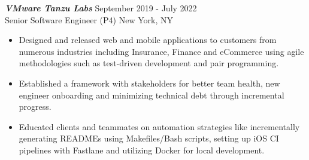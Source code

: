 {\sl \textbf{VMware Tanzu Labs}} \hfill September 2019 - July 2022 \\ Senior Software Engineer (P4) \hfill New York, NY
\begin{itemize}
    \item Designed and released web and mobile applications to customers from numerous industries including Insurance, Finance and eCommerce using agile methodologies such as test-driven development and pair programming.
    \item Established a framework with stakeholders for better team health, new engineer onboarding and minimizing technical debt through incremental progress.
    \item Educated clients and teammates on automation strategies like incrementally generating READMEs using Makefiles/Bash scripts, setting up iOS CI pipelines with Fastlane and utilizing Docker for local development.
\end{itemize}
